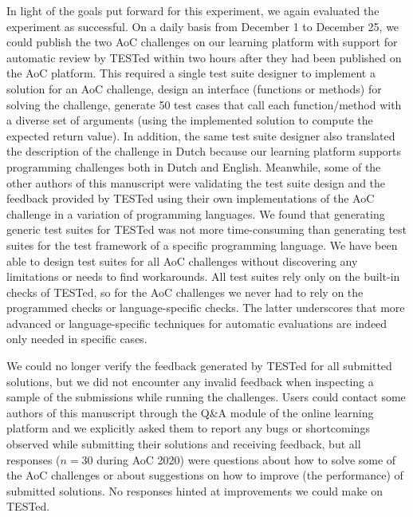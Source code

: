 \documentclass[../main]{subfiles}
\begin{document}
In light of the goals put forward for this experiment, we again evaluated the experiment as successful.
On a daily basis from December 1 to December 25, we could publish the two AoC challenges on our learning platform with support for automatic review by TESTed within two hours after they had been published on the AoC platform.
This required a single test suite designer to implement a solution for an AoC challenge, design an interface (functions or methods) for solving the challenge, generate 50 test cases that call each function/method with a diverse set of arguments (using the implemented solution to compute the expected return value).
In addition, the same test suite designer also translated the description of the challenge in Dutch because our learning platform supports programming challenges both in Dutch and English.
Meanwhile, some of the other authors of this manuscript were validating the test suite design and the feedback provided by TESTed using their own implementations of the AoC challenge in a variation of programming languages.
We found that generating generic test suites for TESTed was not more time-consuming than generating test suites for the test framework of a specific programming language.
We have been able to design test suites for all AoC challenges without discovering any limitations or needs to find workarounds.
All test suites rely only on the built-in checks of TESTed, so for the AoC challenges we never had to rely on the programmed checks or language-specific checks.
The latter underscores that more advanced or language-specific techniques for automatic evaluations are indeed only needed in specific cases.

We could no longer verify the feedback generated by TESTed for all submitted solutions, but we did not encounter any invalid feedback when inspecting a sample of the submissions while running the challenges.
Users could contact some authors of this manuscript through the Q\&A module of the online learning platform and we explicitly asked them to report any bugs or shortcomings observed while submitting their solutions and receiving feedback, but all responses ($n=30$ during AoC 2020) were questions about how to solve some of the AoC challenges or about suggestions on how to improve (the performance) of submitted solutions.
No responses hinted at improvements we could make on TESTed.
\end{document}
